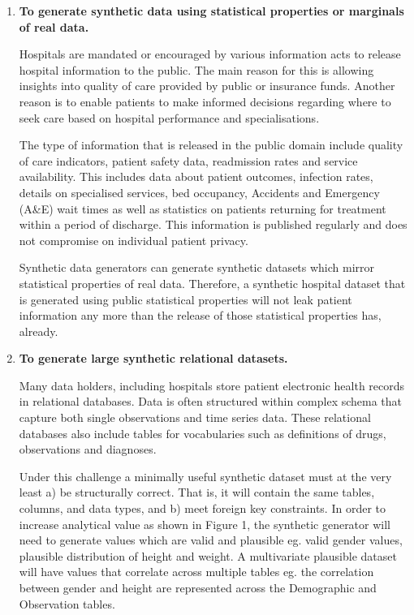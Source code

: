 \documentclass[11pt]{article}
\begin{document}
\begin{enumerate}[leftmargin=*]
    \item \textbf{To generate synthetic data using statistical properties or marginals of real data.
    }
    
    Hospitals are mandated or encouraged by various information acts to release hospital information to the public. The main reason for this is allowing insights into quality of care provided by public or insurance funds. Another reason is to enable patients to make informed decisions regarding where to seek care based on hospital performance and specialisations. 

    The type of information that is released in the public domain include quality of care indicators, patient safety data, readmission rates and service availability. This includes data about patient outcomes, infection rates, details on specialised services, bed occupancy, Accidents and Emergency (A\&E) wait times as well as statistics on patients returning for treatment within a period of discharge. This information is published regularly and does not compromise on individual patient privacy.  

    Synthetic data generators can generate synthetic datasets which mirror statistical properties of real data. Therefore, a synthetic hospital dataset that is generated using public statistical properties will not leak patient information any more than the release of those statistical properties has, already. 

    \item \textbf{To generate large synthetic relational datasets.
    }
    
    Many data holders, including hospitals store patient electronic health records in relational databases. Data is often structured within complex schema that capture both single observations and time series data. These relational databases also include tables for vocabularies such as definitions of drugs, observations and diagnoses. 

    Under this challenge a minimally useful synthetic dataset must at the very least a) be structurally correct. That is, it will contain the same tables, columns, and data types, and b) meet foreign key constraints. In order to increase analytical value as shown in Figure 1, the synthetic generator will need to generate values which are valid and plausible eg. valid gender values, plausible distribution of height and weight.  A multivariate plausible dataset will have values that correlate across multiple tables eg. the correlation between gender and height are represented across the Demographic and Observation tables. 
    

\end{enumerate}
\end{document}
